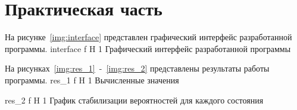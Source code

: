 \chapter{Практическая часть}

На рисунке~\ref{img:interface} представлен графический интерфейс разработанной программы.
	{interface}
	{f}
	{H}
	{1\textwidth}
	{Графический интерфейс разработанной программы}
	
\newpage

На рисунках~\ref{img:res_1}~-~\ref{img:res_2} представлены результаты работы программы.
	{res_1}
	{f}
	{H}
	{1\textwidth}
	{Вычисленные значения}

	{res_2}
	{f}
	{H}
	{1\textwidth}
	{График стабилизации вероятностей для каждого состояния}